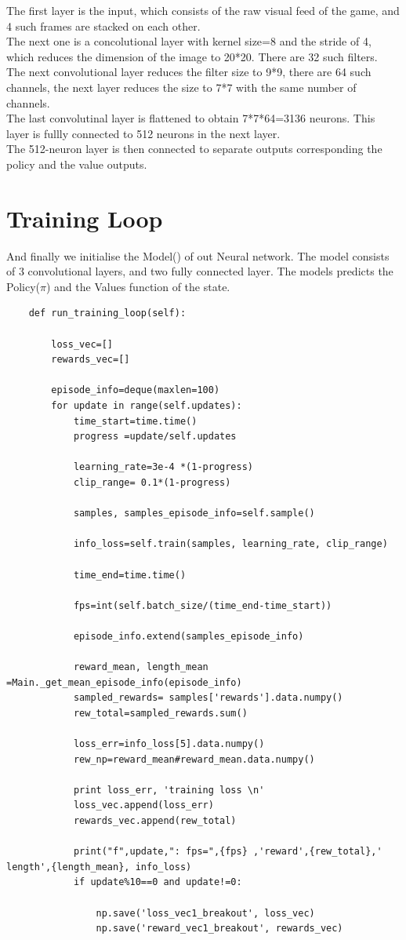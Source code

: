 \documentclass[12pt]{extarticle}
\begin{document}
The first layer is the input, which consists of the raw visual feed of the game, and 4 such frames are stacked on each other. \\
The next one is a concolutional layer with kernel size=8 and the stride of 4, which reduces the dimension of the image to 20*20. There are 32 such filters. \\
The next convolutional layer reduces the filter size to 9*9, there are 64 such channels, the next layer reduces the size to 7*7 with the same number of channels. \\
The last convolutinal layer is flattened to obtain 7*7*64=3136 neurons. This layer is fullly connected to 512 neurons in the next layer. \\
The 512-neuron layer is then connected to separate outputs corresponding the policy and the value outputs. \\


\section{Training Loop}
And finally we initialise the Model() of out Neural network. 
The model consists of 3 convolutional layers, and two fully connected layer. 
The models predicts the Policy($\pi$) and the Values function of the state. 

\begin{lstlisting}
	def run_training_loop(self):

		loss_vec=[]
		rewards_vec=[]

		episode_info=deque(maxlen=100)
		for update in range(self.updates):
			time_start=time.time()
			progress =update/self.updates

			learning_rate=3e-4 *(1-progress)
			clip_range= 0.1*(1-progress)

			samples, samples_episode_info=self.sample()
			
			info_loss=self.train(samples, learning_rate, clip_range)
			
			time_end=time.time()

			fps=int(self.batch_size/(time_end-time_start))

			episode_info.extend(samples_episode_info)
			
			reward_mean, length_mean =Main._get_mean_episode_info(episode_info)
			sampled_rewards= samples['rewards'].data.numpy()
			rew_total=sampled_rewards.sum()

			loss_err=info_loss[5].data.numpy()
			rew_np=reward_mean#reward_mean.data.numpy()

			print loss_err, 'training loss \n'
			loss_vec.append(loss_err)
			rewards_vec.append(rew_total)

			print("f",update,": fps=",{fps} ,'reward',{rew_total},' length',{length_mean}, info_loss)
			if update%10==0 and update!=0:

				np.save('loss_vec1_breakout', loss_vec)
				np.save('reward_vec1_breakout', rewards_vec)


\end{lstlisting}
\end{document}
